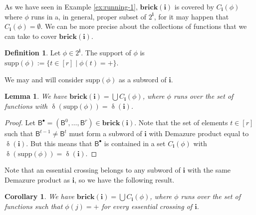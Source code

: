 \documentclass[a4paper, 11pt]{amsart}
\newcommand{\brick}{\mathbf{brick}}
\newcommand{\flag}[1]{\mathsf{B}^{#1}}
\newcommand{\supp}{\mathrm{supp}}
\newcommand{\word}[1]{\mathbf{#1}}
\DeclareMathOperator{\dem}{\delta}
\newtheorem{corollary}[theorem]{Corollary}%
\newtheorem{lemma}[theorem]{Lemma}%
\theoremstyle{definition}
\newtheorem{definition}[theorem]{Definition}
\begin{document}
As we have seen in Example \ref{ex:running-1}, $\brick(\word{i})$ is covered by $C_{\word{i}}(\phi)$ where $\phi$ runs in a, in general, proper subset of $2^{\word{i}}$, for it may happen that $C_{\word{i}}(\phi) = \emptyset$. We can be more precise about the collections of functions that we can take to cover $\brick(\word{i})$.

\begin{definition}
    Let $\phi \in 2^{\word{i}}$. The support of $\phi$ is $\supp(\phi) := \{t \in [r] \mid \phi(t) = +\}$.
\end{definition}

We may and will consider $\supp(\phi)$ as a subword of $\word{i}$. 

\begin{lemma}
We have $\brick(\word{i}) = \bigcup C_{\word{i}}(\phi)$, where $\phi$ runs over the set of functions with $\dem(\supp(\phi)) = \dem(\word{i})$.
\end{lemma}
\begin{proof}
Let $\flag{\bullet} = (\flag{0}, \dots, \flag{r}) \in \brick(\word{i})$. Note that the set of elements $t \in [r]$ such that $\flag{t-1} \neq \flag{t}$ must form a subword of $\word{i}$ with Demazure product equal to $\dem(\word{i})$. But this means that $\flag{\bullet}$ is contained in a set $C_{\word{i}}(\phi)$ with $\dem(\supp(\phi)) = \dem(\word{i})$. 
\end{proof}

Note that an essential crossing belongs to any subword of $\word{i}$ with the same Demazure product as $\word{i}$, so we have the following result.

\begin{corollary}\label{cor:not-essential}
    We have $\brick(\word{i}) = \bigcup C_{\word{i}}(\phi)$, where $\phi$ runs over the set of functions such that $\phi(j) = +$ for every essential crossing of $\word{i}$.
\end{corollary}
\end{document}
